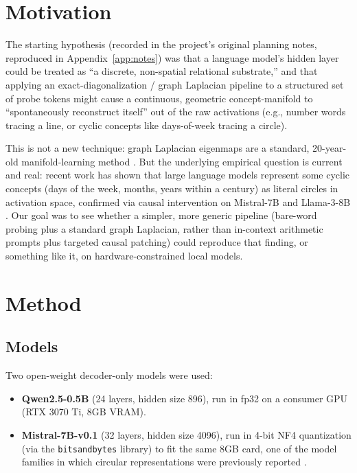 \documentclass[11pt]{article}
\begin{document}
\section{Motivation}

The starting hypothesis (recorded in the project's original planning notes,
reproduced in Appendix~\ref{app:notes}) was that a language model's hidden
layer could be treated as ``a discrete, non-spatial relational substrate,''
and that applying an exact-diagonalization / graph Laplacian pipeline to a
structured set of probe tokens might cause a continuous, geometric
concept-manifold to ``spontaneously reconstruct itself'' out of the raw
activations (e.g., number words tracing a line, or cyclic concepts like
days-of-week tracing a circle).

This is not a new technique: graph Laplacian eigenmaps are a standard,
20-year-old manifold-learning method \cite{belkin2003laplacian}. But the
underlying empirical question is current and real: recent work has shown that
large language models represent some cyclic concepts (days of the week,
months, years within a century) as literal circles in activation space,
confirmed via causal intervention on Mistral-7B and Llama-3-8B
\cite{engels2024not}. Our goal was to see whether a simpler, more generic
pipeline (bare-word probing plus a standard graph Laplacian, rather than
in-context arithmetic prompts plus targeted causal patching) could reproduce
that finding, or something like it, on hardware-constrained local models.

\section{Method}

\subsection{Models}
Two open-weight decoder-only models were used:
\begin{itemize}
  \item \textbf{Qwen2.5-0.5B} (24 layers, hidden size 896), run in fp32 on a
        consumer GPU (RTX 3070 Ti, 8GB VRAM).
  \item \textbf{Mistral-7B-v0.1} (32 layers, hidden size 4096), run in 4-bit
        NF4 quantization (via the \texttt{bitsandbytes} library) to fit the
        same 8GB card, one of the model families in which circular
        representations were previously reported \cite{engels2024not}.
\end{itemize}
\end{document}
